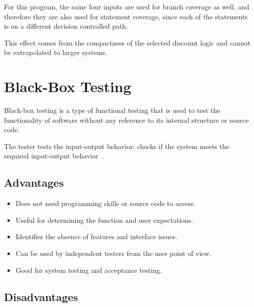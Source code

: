 \documentclass[conference]{IEEEtran}
\begin{document}
For this program, the same four inputs are used for branch coverage as well, and therefore they are also used for statement coverage, since each of the statements is on a different decision controlled path.

This effect comes from the compactness of the selected discount logic and cannot be extrapolated to larger systems.





\section{Black-Box Testing}

\label{sec:blackbox}



Black-box testing is a type of functional testing that is used to test the functionality of software without any reference to its internal structure or source code.

The tester tests the input-output behavior; checks if the system meets the required input-output behavior~\cite{nidhra2012,alshamaa2025}.



\subsection{Advantages}

\begin{itemize}

\item Does not need programming skills or source code to access.

\item Useful for determining the function and user expectations.

\item Identifies the absence of features and interface issues.

\item Can be used by independent testers from the user point of view.

\item Good for system testing and acceptance testing.

\end{itemize}



\subsection{Disadvantages}
\end{document}
